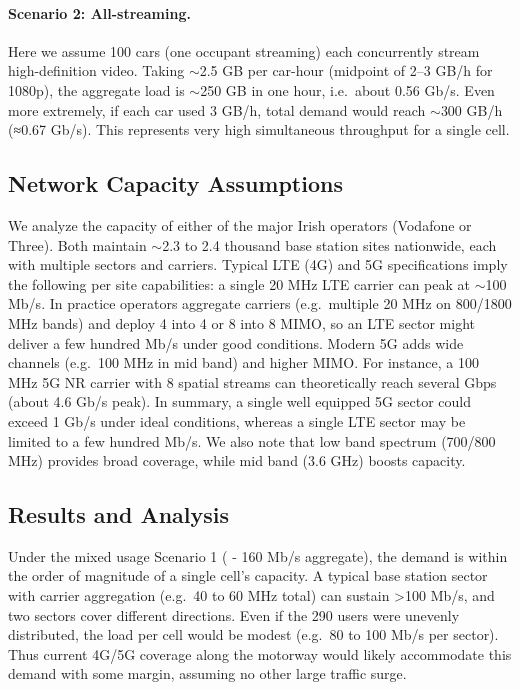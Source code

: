 \documentclass[MScCS]{uccthesis}
\begin{document}
 \paragraph{Scenario 2: All-streaming.} Here we assume 100 cars (one occupant streaming) each concurrently stream high-definition video. Taking $\sim$2.5 GB per car-hour (midpoint of 2–3 GB/h for 1080p\cite{roamless_streaming}), the aggregate load is $\sim$250 GB in one hour, i.e.\ about 0.56 Gb/s. Even more extremely, if each car used 3 GB/h, total demand would reach $\sim$300 GB/h (≈0.67 Gb/s). This represents very high simultaneous throughput for a single cell.

\subsection{Network Capacity Assumptions}
We analyze the capacity of either of the major Irish operators (Vodafone or Three). Both maintain $\sim$2.3 to 2.4 thousand base station sites nationwide\cite{comreg_base_stations}, each with multiple sectors and carriers. Typical LTE (4G) and 5G specifications imply the following per site capabilities: a single 20 MHz LTE carrier can peak at $\sim$100 Mb/s\cite{artizanetworks_lte}. In practice operators aggregate carriers (e.g.\ multiple 20 MHz on 800/1800 MHz bands) and deploy 4 into 4 or 8 into 8 MIMO, so an LTE sector might deliver a few hundred Mb/s under good conditions. Modern 5G adds wide channels (e.g.\ 100 MHz in mid band) and higher MIMO. For instance, a 100 MHz 5G NR carrier with 8 spatial streams can theoretically reach several Gbps (about 4.6 Gb/s peak\cite{devopedia_5g}). In summary, a single well equipped 5G sector could exceed 1 Gb/s under ideal conditions, whereas a single LTE sector may be limited to a few hundred Mb/s. We also note that low band spectrum (700/800 MHz) provides broad coverage, while mid band (3.6 GHz) boosts capacity\cite{comreg_spectrum}.

\subsection{Results and Analysis}
Under the mixed usage Scenario 1 ( - 160 Mb/s aggregate), the demand is within the order of magnitude of a single cell's capacity. A typical base station sector with carrier aggregation (e.g.\ 40 to 60 MHz total) can sustain >100 Mb/s, and two sectors cover different directions. Even if the 290 users were unevenly distributed, the load per cell would be modest (e.g.\ 80 to 100 Mb/s per sector). Thus current 4G/5G coverage along the motorway would likely accommodate this demand with some margin, assuming no other large traffic surge.
\end{document}
